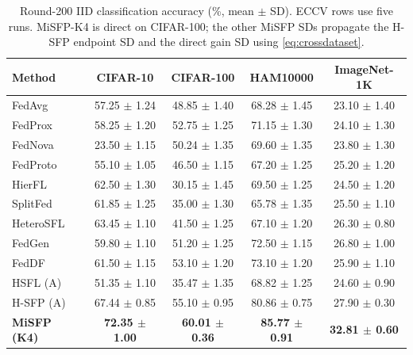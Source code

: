 \begin{table}[t]
\caption{Round-200 IID classification accuracy (\%, mean $\pm$ SD). ECCV rows use five runs. MiSFP-K4 is direct on CIFAR-100; the other MiSFP SDs propagate the H-SFP endpoint SD and the direct gain SD using \cref{eq:crossdataset}.}
\label{tab:classification200}
\centering\footnotesize
\setlength{\tabcolsep}{4pt}
\begin{tabular*}{\textwidth}{@{\extracolsep{\fill}}lcccc@{}}\toprule
Method & CIFAR-10 & CIFAR-100 & HAM10000 & ImageNet-1K\\\midrule
FedAvg & 57.25 {\scriptsize $\pm$ 1.24} & 48.85 {\scriptsize $\pm$ 1.40} & 68.28 {\scriptsize $\pm$ 1.45} & 23.10 {\scriptsize $\pm$ 1.40} \\
FedProx & 58.25 {\scriptsize $\pm$ 1.20} & 52.75 {\scriptsize $\pm$ 1.25} & 71.15 {\scriptsize $\pm$ 1.30} & 24.10 {\scriptsize $\pm$ 1.30} \\
FedNova & 23.50 {\scriptsize $\pm$ 1.15} & 50.24 {\scriptsize $\pm$ 1.35} & 69.60 {\scriptsize $\pm$ 1.35} & 23.80 {\scriptsize $\pm$ 1.30} \\
FedProto & 55.10 {\scriptsize $\pm$ 1.05} & 46.50 {\scriptsize $\pm$ 1.15} & 67.20 {\scriptsize $\pm$ 1.25} & 25.20 {\scriptsize $\pm$ 1.20} \\
HierFL & 62.50 {\scriptsize $\pm$ 1.30} & 30.15 {\scriptsize $\pm$ 1.45} & 69.50 {\scriptsize $\pm$ 1.25} & 24.50 {\scriptsize $\pm$ 1.20} \\
SplitFed & 61.85 {\scriptsize $\pm$ 1.25} & 35.00 {\scriptsize $\pm$ 1.30} & 65.78 {\scriptsize $\pm$ 1.35} & 25.50 {\scriptsize $\pm$ 1.10} \\
HeteroSFL & 63.45 {\scriptsize $\pm$ 1.10} & 41.50 {\scriptsize $\pm$ 1.25} & 67.10 {\scriptsize $\pm$ 1.20} & 26.30 {\scriptsize $\pm$ 0.80} \\
FedGen & 59.80 {\scriptsize $\pm$ 1.10} & 51.20 {\scriptsize $\pm$ 1.25} & 72.50 {\scriptsize $\pm$ 1.15} & 26.80 {\scriptsize $\pm$ 1.00} \\
FedDF & 61.50 {\scriptsize $\pm$ 1.15} & 53.10 {\scriptsize $\pm$ 1.20} & 73.10 {\scriptsize $\pm$ 1.20} & 25.90 {\scriptsize $\pm$ 1.10} \\
HSFL (A) & 51.35 {\scriptsize $\pm$ 1.10} & 35.47 {\scriptsize $\pm$ 1.35} & 68.82 {\scriptsize $\pm$ 1.25} & 24.60 {\scriptsize $\pm$ 0.90} \\
H-SFP (A) & 67.44 {\scriptsize $\pm$ 0.85} & 55.10 {\scriptsize $\pm$ 0.95} & 80.86 {\scriptsize $\pm$ 0.75} & 27.90 {\scriptsize $\pm$ 0.30} \\
\textbf{MiSFP (K4)} & \textbf{72.35 {\scriptsize $\pm$ 1.00}} & \textbf{60.01 {\scriptsize $\pm$ 0.36}} & \textbf{85.77 {\scriptsize $\pm$ 0.91}} & \textbf{32.81 {\scriptsize $\pm$ 0.60}} \\
\bottomrule\end{tabular*}
\end{table}

